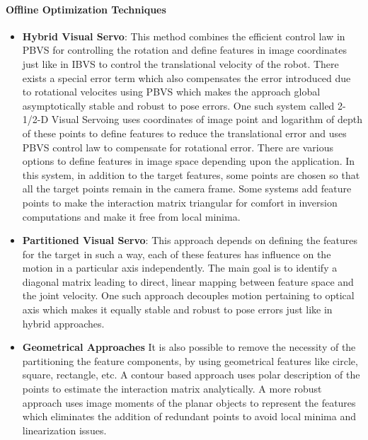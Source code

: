 \paragraph{Offline Optimization Techniques}
\begin{itemize}

    \item \textbf{Hybrid Visual Servo}: This method combines the efficient control law in PBVS for controlling the rotation and define features in image coordinates just like in 
    IBVS to control the translational velocity of the robot. There exists a special error term which also compensates the error introduced due to rotational velocites using PBVS which
    makes the approach global asymptotically stable and robust to pose errors. One such system called 2-1/2-D Visual Servoing\cite{Malis1999} uses coordinates of image point  
    and logarithm of depth of these points to define features to reduce the translational error and uses PBVS control law to compensate for rotational error. There are various
    options to define features in image space depending upon the application. In this system\cite{Morel2d}, in addition to the target features, some points are chosen so that all the
    target points remain in the camera frame. Some systems add feature points to make the interaction matrix triangular for comfort in inversion computations\cite{Morel2d} and make it free from local minima\cite{Morel04extended}. 
    
    \item \textbf{Partitioned Visual Servo}: This approach depends on defining the features for the target in such a way, each of these features has influence on the motion in a particular axis independently. The main goal is to identify a diagonal matrix leading to direct, linear mapping between feature space and the joint velocity. One such 
    approach\cite{Corke2001} decouples motion pertaining to optical axis which makes it equally stable and robust to pose errors just like in hybrid approaches. 
    
    \item \textbf{Geometrical Approaches}
    It is also possible to remove the necessity of the partitioning the feature components, by using geometrical features like circle, square, rectangle, etc. A contour based
    approach\cite{Collewet2000} uses polar description of the points to estimate the interaction matrix analytically. A more robust approach\cite{Chaumette2004} uses image moments
    of the planar objects to represent the features which eliminates the addition of redundant points to avoid local minima and linearization issues\cite{Tahri2005}.
    
\end{itemize}
